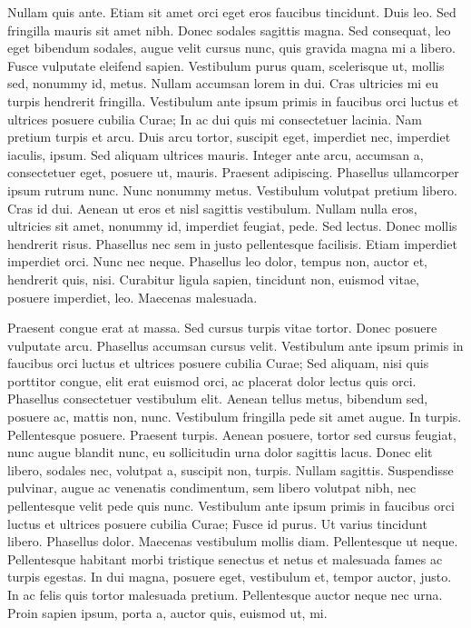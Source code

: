 \documentclass[a4paper,11pt]{scrartcl}
\begin{document}
 Nullam quis ante. Etiam sit amet orci eget eros faucibus tincidunt. Duis leo. Sed fringilla mauris sit amet nibh. Donec sodales sagittis magna. Sed consequat, leo eget bibendum sodales, augue velit cursus nunc, quis gravida magna mi a libero. Fusce vulputate eleifend sapien. Vestibulum purus quam, scelerisque ut, mollis sed, nonummy id, metus. Nullam accumsan lorem in dui. Cras ultricies mi eu turpis hendrerit fringilla. Vestibulum ante ipsum primis in faucibus orci luctus et ultrices posuere cubilia Curae; In ac dui quis mi consectetuer lacinia. Nam pretium turpis et arcu. Duis arcu tortor, suscipit eget, imperdiet nec, imperdiet iaculis, ipsum. Sed aliquam ultrices mauris. Integer ante arcu, accumsan a, consectetuer eget, posuere ut, mauris. Praesent adipiscing. Phasellus ullamcorper ipsum rutrum nunc. Nunc nonummy metus. Vestibulum volutpat pretium libero. Cras id dui. Aenean ut eros et nisl sagittis vestibulum. Nullam nulla eros, ultricies sit amet, nonummy id, imperdiet feugiat, pede. Sed lectus. Donec mollis hendrerit risus. Phasellus nec sem in justo pellentesque facilisis. Etiam imperdiet imperdiet orci. Nunc nec neque. Phasellus leo dolor, tempus non, auctor et, hendrerit quis, nisi. Curabitur ligula sapien, tincidunt non, euismod vitae, posuere imperdiet, leo. Maecenas malesuada.

 Praesent congue erat at massa. Sed cursus turpis vitae tortor. Donec posuere vulputate arcu. Phasellus accumsan cursus velit. Vestibulum ante ipsum primis in faucibus orci luctus et ultrices posuere cubilia Curae; Sed aliquam, nisi quis porttitor congue, elit erat euismod orci, ac placerat dolor lectus quis orci. Phasellus consectetuer vestibulum elit. Aenean tellus metus, bibendum sed, posuere ac, mattis non, nunc. Vestibulum fringilla pede sit amet augue. In turpis. Pellentesque posuere. Praesent turpis. Aenean posuere, tortor sed cursus feugiat, nunc augue blandit nunc, eu sollicitudin urna dolor sagittis lacus. Donec elit libero, sodales nec, volutpat a, suscipit non, turpis. Nullam sagittis. Suspendisse pulvinar, augue ac venenatis condimentum, sem libero volutpat nibh, nec pellentesque velit pede quis nunc. Vestibulum ante ipsum primis in faucibus orci luctus et ultrices posuere cubilia Curae; Fusce id purus. Ut varius tincidunt libero. Phasellus dolor. Maecenas vestibulum mollis diam. Pellentesque ut neque. Pellentesque habitant morbi tristique senectus et netus et malesuada fames ac turpis egestas. In dui magna, posuere eget, vestibulum et, tempor auctor, justo. In ac felis quis tortor malesuada pretium. Pellentesque auctor neque nec urna. Proin sapien ipsum, porta a, auctor quis, euismod ut, mi.
\end{document}
